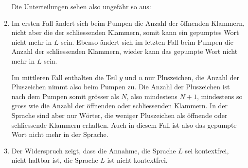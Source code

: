 \begin{loesung}
\begin{enumerate}
Die Unterteilungen sehen also ungefähr so aus:
\begin{center}
\def\rechteck{
	\fill[color=gray!40] \punkt{0}{0} rectangle \punkt{22}{1};
	\foreach \x in {0.5,1.5,...,8}{
		\node[color=white] at \punkt{\x}{0.5} {$\texttt{(}\mathstrut$};
	}
	\foreach \x in {8.5,9.5,...,15}{
		\node[color=white] at \punkt{\x}{0.5} {$\texttt{+}\mathstrut$};
	}
	\foreach \x in {15.5,16.5,...,22}{
		\node[color=white] at \punkt{\x}{0.5} {$\texttt{)}\mathstrut$};
	}
	\draw \punkt{0}{0} rectangle \punkt{22}{1};
	\draw \punkt{8}{0} -- \punkt{8}{1};
	\draw \punkt{15}{0} -- \punkt{15}{1};
	\node at \punkt{8}{1} [above] {$N+1$};
	\node at \punkt{15}{1} [above] {$2N+1$};
	\node at \punkt{22}{1} [above] {$3N+2$};
}
\def\unterteilung#1{
	\rechteck
	\kasten{0}{#1}{blue}{x}
	\kasten{#1}{#1+1}{red}{y}
	\kasten{#1+1}{#1+2.5}{darkgreen}{z}
	\kasten{#1+2.5}{#1+4}{red}{u}
	\kasten{#1+4}{22}{blue}{v}
	\draw[line width=0.4pt] \punkt{#1}{-0.6} -- \punkt{#1}{1.1};
	\draw[line width=0.4pt] \punkt{#1+4}{-0.6} -- \punkt{#1+4}{1.1};
	\draw[<->] \punkt{#1}{-0.3} -- \punkt{#1+4}{-0.3};
	\node at \punkt{#1+2}{-0.2} [below] {$\le N$};
}
\end{center}
\item
Im ersten Fall ändert sich beim Pumpen die Anzahl der
öffnenden Klammern, nicht aber die der schliessenden Klammern, somit
kann ein gepumptes Wort nicht mehr in $L$ sein.
Ebenso ändert sich im letzten Fall beim Pumpen die Anzahl der schliessenden
Klammern, wieder kann das gepumpte Wort nicht mehr in $L$ sein.

Im mittleren Fall enthalten die Teil $y$ und $u$ nur Pluszeichen, die Anzahl
der Pluszeichen nimmt also beim Pumpen zu.
Die Anzahl der Pluszeichen ist nach dem Pumpen somit grösser als $N$, also
mindestens $N+1$, mindestens so gross wie die Anzahl der öffnenden oder
schliessenden Klammern.
In der Sprache sind aber nur Wörter, die weniger Pluszeichen als öffnende oder
schliessende Klammern erhalten.
Auch in diesem Fall ist also das gepumpte Wort nicht mehr in der Sprache.
\item
Der Widerspruch zeigt, dass die Annahme, die Sprache $L$ sei kontextfrei,
nicht haltbar ist,
die Sprache $L$ ist nicht kontextfrei.
\qedhere
\end{enumerate}
\end{loesung}
